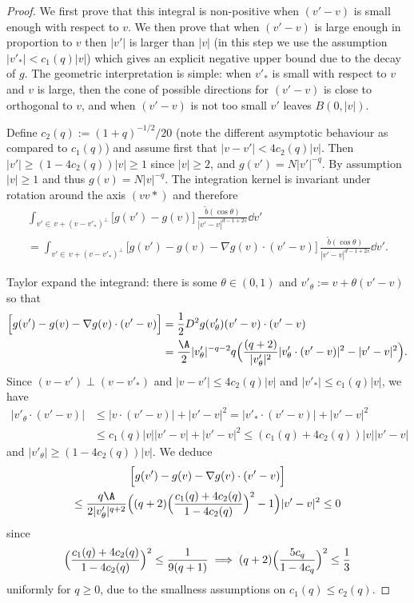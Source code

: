 \begin{proof}
We first prove that this integral is non-positive when $(v'-v)$ is
small enough with respect to $v$. We then prove that when $(v'-v)$
is large enough in proportion to $v$ then $|v'|$ is larger than
$|v|$ (in this step we use the assumption $|v'_*| < c_1(q) |v|$) which
gives an explicit negative upper bound due to the decay of $g$. The
geometric interpretation is simple: when $v'_*$ is small with
respect to $v$ and $v$ is large, then the cone of possible
directions for $(v'-v)$ is close to orthogonal to $v$, and when
$(v'-v)$ is not too small $v'$ leaves $B(0,|v|)$.

Define $c_2(q) := (1+q)^{-1/2}/20$ (note the different asymptotic
behaviour as compared to $c_1(q)$) and assume first that
$|v-v'| < 4 c_2(q) |v|$. Then $|v'| \ge (1-4c_2(q))|v| \ge 1$ since
$|v| \ge 2$, and $g(v') = N |v'|^{-q}$. By assumption $|v| \ge 1$
and thus $g(v) = N |v|^{-q}$. The integration kernel is invariant
under rotation around the axis $(vv*)$ and therefore
\begin{multline*}
\int_{v'\in \, v + (v-v'_*)^\bot} \big[ g(v') - g(v)\big]\, \frac{\tilde
b(\cos \theta)}{|v'-v|^{d-1+2s}} \dd v' \\ =
\int_{v'\in \, v + (v-v'_*)^\bot} \Big[ g(v') - g(v) - \nabla g(v)
\cdot (v'-v) \Big]\, \frac{\tilde
b(\cos \theta)}{|v'-v|^{d-1+2s}} \dd v'.
\end{multline*}

Taylor expand the integrand: there is some $\theta \in (0,1)$ and
$v'_\theta := v + \theta(v'-v)$ so that
\begin{align}
\nonumber
\Big[ g(v')-g(v) - \nabla g (v) \cdot (v'-v) \Big]
&= \frac12 D^2 g (v'_\theta) (v'-v)\cdot (v'-v) \\
\label{eq:taylor}
& = \frac{\A}{2} |v'_\theta |^{-q-2} q
\Bigl(\frac{(q+2)}{|v'_\theta|^2} |v'_\theta \cdot (v'-v)|^2 - |v'-v|^2 \Bigr).
\end{align}
Since $(v-v') \perp (v-v'_*)$ and $|v-v'| \le 4 c_2(q) |v|$ and $|v'_*|\le c_1(q) |v|$, we have
\begin{align*}
|v'_\theta \cdot (v'-v)| & \le |v\cdot (v'-v)| + |v'-v|^2 = |v'_*
\cdot (v'-v)| + |v'-v|^2 \\ & \le c_1(q) |v||v'-v| + |v'-v|^2 \le
\left( c_1(q) + 4 c_2(q) \right) |v| |v'-v|
\end{align*}
and $|v'_\theta| \geq (1-4c_2(q)) |v|$. We deduce
\begin{multline} \label{e:small z}
\Big[ g(v')-g(v) - \nabla g (v) \cdot (v'-v) \Big]\\
\le \frac{q
\A}{2|v'_\theta |^{q+2}}
\Bigl((q+2)\Bigl(\frac{c_1(q) + 4 c_2(q)}{1-4c_2(q)}\Bigr)^2-1 \Bigr)|v'-v|^2 \le 0
\end{multline}
since
\[
\Bigl(\frac{c_1(q)+4c_2(q)}{1-4c_2(q)}\Bigr)^2 \le \frac{1}{9(q+1)} \implies (q+2) \Bigl(\frac{5c_q}{1-4c_q}\Bigr)^2 \le \frac{1}{3}
\]
uniformly for $q \ge 0$, due to the smallness assumptions on
$c_1(q) \le c_2(q)$.


\end{proof}
